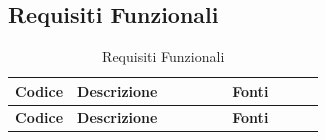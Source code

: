 \documentclass[a4paper,12pt]{article}
\begin{document}
{        \subsection{Requisiti Funzionali} {
            \begin{longtable}{|l|P{0.5\linewidth}|P{0.3\linewidth}|}
                \caption{Requisiti Funzionali} \\
                
                \hline
                \textbf{Codice} & \textbf{Descrizione} & \textbf{Fonti} \\
                \hline
                \endfirsthead
                
                \hline
                \textbf{Codice} & \textbf{Descrizione} & \textbf{Fonti} \\
                \hline
                \endhead
                

\end{longtable}}}
\end{document}
